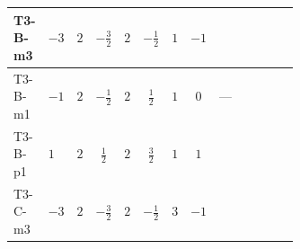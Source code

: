 \documentclass[8pt]{article}
\begin{document}
\begin{landscape}
\begin{longtable}{@{}llcccccc >{\raggedright\arraybackslash}p{0.21\linewidth} >{\raggedright\arraybackslash}p{0.21\linewidth} >{\raggedright\arraybackslash}p{0.21\linewidth}@{}}
\midrule
T3-B-m3 & $-3$ & $2$ & $-\frac{3}{2}$ & $2$ & $-\frac{1}{2}$ & $1$ & $-1$ & \scriptsize\adjustbox{max width=\linewidth}{$\begin{gathered} +{g_1}^2 \left(18 {g_2}^2-15 {\lambda_{12}^{(A)}}\right)\end{gathered}$} & \scriptsize\adjustbox{max width=\linewidth}{$\begin{gathered} -9 {g_2}^2 {\lambda_{12}^{(A)}}\end{gathered}$} & \scriptsize\adjustbox{max width=\linewidth}{$\begin{gathered} +8 {\lambda_{12}^{(1)}} {\lambda_{12}^{(A)}}\end{gathered}$} \\
\midrule
T3-B-m1 & $-1$ & $2$ & $-\frac{1}{2}$ & $2$ & $\frac{1}{2}$ & $1$ & $0$ & --- & \scriptsize\adjustbox{max width=\linewidth}{$\begin{gathered} -9 {g_2}^2 {\lambda_{12}^{(A)}}\end{gathered}$} & \scriptsize\adjustbox{max width=\linewidth}{$\begin{gathered} +8 {\lambda_{12}^{(1)}} {\lambda_{12}^{(A)}}\end{gathered}$} \\
\midrule
T3-B-p1 & $1$ & $2$ & $\frac{1}{2}$ & $2$ & $\frac{3}{2}$ & $1$ & $1$ & \scriptsize\adjustbox{max width=\linewidth}{$\begin{gathered} +{g_1}^2 \left(18 {g_2}^2-15 {\lambda_{12}^{(A)}}\right)\end{gathered}$} & \scriptsize\adjustbox{max width=\linewidth}{$\begin{gathered} -9 {g_2}^2 {\lambda_{12}^{(A)}}\end{gathered}$} & \scriptsize\adjustbox{max width=\linewidth}{$\begin{gathered} +8 {\lambda_{12}^{(1)}} {\lambda_{12}^{(A)}}\end{gathered}$} \\
\midrule
T3-C-m3 & $-3$ & $2$ & $-\frac{3}{2}$ & $2$ & $-\frac{1}{2}$ & $3$ & $-1$ & \scriptsize\adjustbox{max width=\linewidth}{$\begin{gathered} +{g_1}^2 \left(18 {g_2}^2-15 {\lambda_{12}^{(A)}}\right)\end{gathered}$} & \scriptsize\adjustbox{max width=\linewidth}{$\begin{gathered} -9 {g_2}^2 {\lambda_{12}^{(A)}}\end{gathered}$} & \scriptsize\adjustbox{max width=\linewidth}{$\begin{gathered} +8 {\lambda_{12}^{(1)}} {\lambda_{12}^{(A)}}\end{gathered}$} \\

\end{longtable}
\end{landscape}
\end{document}
